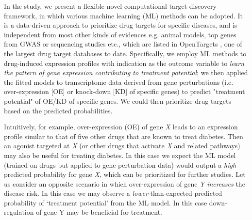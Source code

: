     In the study, we present a flexible novel computational target discovery framework, in which various machine learning (ML) methods can be adopted. It is a data-driven approach to prioritize drug targets for specific diseases, and is independent from most other kinds of evidences e.g. animal models, top genes from GWAS or sequencing studies etc., which are listed  in OpenTargets \cite{koscielny2017open}, one of the largest drug target databases to date. Specifically, we employ ML methods to drug-induced expression profiles with indication as the outcome variable to \textit{learn the pattern of gene expression contributing to treatment potential}; we then applied the fitted models to transcriptome data derived from gene perturbations (i.e. over-expression [OE] or knock-down [KD] of specific genes) to predict "treatment potential" of OE/KD of specific genes. We could then prioritize drug targets based on the predicted probabilities. 

    Intuitively, for example, over-expression (OE) of gene\textit{ X} leads to an expression profile similar to that of five other drugs that are known to treat diabetes. Then an agonist targeted at \textit{X }(or other drugs that activate\textit{ X }and related pathways) may also be useful for treating diabetes. In this case we expect the ML model (trained on drugs but applied to gene perturbation data) would output a \textit{high }predicted probability for gene \textit{X}, which can be prioritized for further studies. Let us consider an opposite scenario in which over-expression of gene \textit{Y }\textit{increases} the disease risk. In this case we may observe a \textit{lower}-than-expected predicted probability of ‘treatment potential’ from the ML model. In this case down-regulation of gene Y may be beneficial for treatment. 


